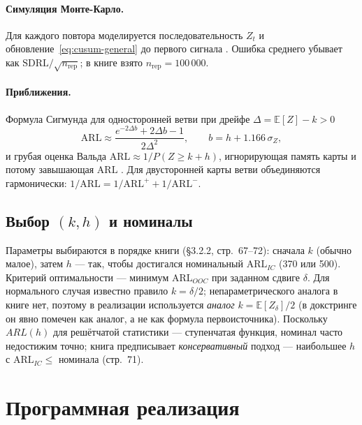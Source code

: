 \documentclass[11pt,a4paper]{article}
\newcommand{\ARL}{\mathrm{ARL}}
\newcommand{\SDRL}{\mathrm{SDRL}}
\newcommand{\E}{\mathbb{E}}
\begin{document}
\paragraph{Симуляция Монте-Карло.} Для каждого повтора моделируется
последовательность $Z_t$ и обновление~\eqref{eq:cusum-general} до первого
сигнала \cite[\S4.2.2.3.2, стр.~205; \S4.2.2.4.3, стр.~207--208]{Chakraborti2019}.
Ошибка среднего убывает как $\SDRL/\sqrt{n_{\text{rep}}}$; в книге взято
$n_{\text{rep}}=100\,000$.

\paragraph{Приближения.} Формула Сигмунда для односторонней ветви при
дрейфе $\Delta = \E[Z]-k>0$
\begin{equation}
\ARL \approx \frac{e^{-2\Delta b} + 2\Delta b - 1}{2\Delta^2},\qquad
b = h + 1.166\,\sigma_Z,
\label{eq:siegmund}
\end{equation}
и грубая оценка Вальда $\ARL \approx 1/P(Z \ge k+h)$, игнорирующая память
карты и потому завышающая $\ARL$ \cite{Siegmund1985}. Для двусторонней
карты ветви объединяются гармонически: $1/\ARL = 1/\ARL^+ + 1/\ARL^-$.

\subsection{Выбор $(k,h)$ и номиналы}
\label{sec:math-design}

Параметры выбираются в порядке книги (\S3.2.2, стр.~67--72):
сначала $k$ (обычно малое), затем $h$ --- так, чтобы достигался номинальный
$\ARL_{IC}$ (370 или 500). Критерий оптимальности --- минимум
$\ARL_{OOC}$ при заданном сдвиге $\delta$. Для нормального случая известно
правило $k = \delta/2$; непараметрического аналога в книге нет, поэтому в
реализации используется \emph{аналог} $k = \E[Z_\delta]/2$ (в докстринге
он явно помечен как аналог, а не как формула первоисточника). Поскольку
$ARL(h)$ для решётчатой статистики --- ступенчатая функция, номинал часто
недостижим точно; книга предписывает \emph{консервативный} подход ---
наибольшее $h$ с $\ARL_{IC}\le$ номинала (стр.~71).

\section{Программная реализация}
\label{sec:impl}
\end{document}
